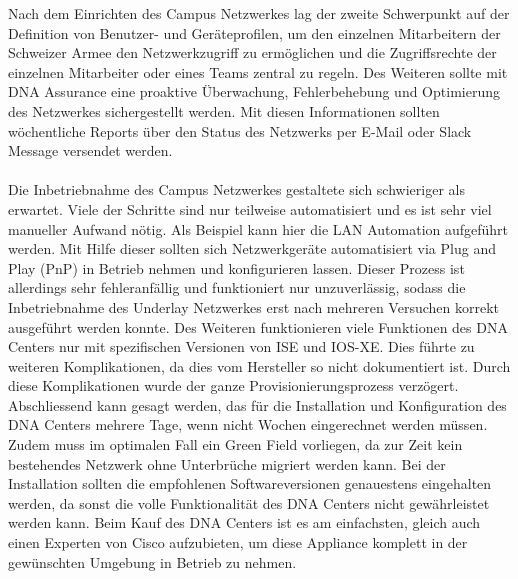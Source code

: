 Nach dem Einrichten des Campus Netzwerkes lag der zweite Schwerpunkt auf der Definition von Benutzer- und Geräteprofilen, um den einzelnen Mitarbeitern der Schweizer Armee den Netzwerkzugriff zu ermöglichen und die Zugriffsrechte der einzelnen Mitarbeiter oder eines Teams zentral zu regeln. Des Weiteren sollte mit DNA Assurance eine proaktive Überwachung, Fehlerbehebung und Optimierung des Netzwerkes sichergestellt werden. Mit diesen Informationen sollten wöchentliche Reports über den Status des Netzwerks per E-Mail oder Slack Message versendet werden.\\
\\
Die Inbetriebnahme des Campus Netzwerkes gestaltete sich schwieriger als erwartet. Viele der Schritte sind nur teilweise automatisiert und es ist sehr viel manueller Aufwand nötig. Als Beispiel kann hier die LAN Automation aufgeführt werden. Mit Hilfe dieser sollten sich Netzwerkgeräte automatisiert via Plug and Play (PnP) in Betrieb nehmen und konfigurieren lassen. Dieser Prozess ist allerdings sehr fehleranfällig und funktioniert nur unzuverlässig, sodass die Inbetriebnahme des Underlay Netzwerkes erst nach mehreren Versuchen korrekt ausgeführt werden konnte. 
Des Weiteren funktionieren viele Funktionen des DNA Centers nur mit spezifischen Versionen von ISE und IOS-XE. Dies führte zu weiteren Komplikationen, da dies vom Hersteller so nicht dokumentiert ist. 
Durch diese Komplikationen wurde der ganze Provisionierungsprozess verzögert. 
\\
Abschliessend kann gesagt werden, das für die Installation und Konfiguration des DNA Centers mehrere Tage, wenn nicht Wochen eingerechnet werden müssen. Zudem muss im optimalen Fall ein Green Field vorliegen, da zur Zeit kein bestehendes Netzwerk ohne Unterbrüche migriert werden kann. Bei der Installation sollten die empfohlenen Softwareversionen genauestens eingehalten werden, da sonst die volle Funktionalität des DNA Centers nicht gewährleistet werden kann. Beim Kauf des DNA Centers ist es am einfachsten, gleich auch einen Experten von Cisco aufzubieten, um diese Appliance komplett in der gewünschten Umgebung in Betrieb zu nehmen. 


